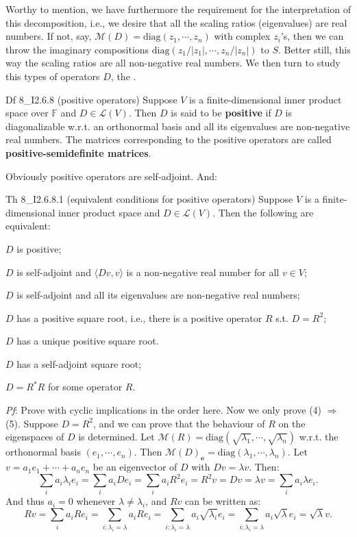 \documentclass{article}
\begin{document}
Worthy to mention, we have furthermore the requirement for the interpretation of this decomposition, i.e., we desire that all the scaling ratios (eigenvalues) are real numbers. If not, say, $\mathcal{M}(D) = \text{diag}(z_1, \cdots, z_n)$ with complex $z_i$'s, then we can throw the imaginary compositions $\text{diag}(z_1/|z_1|, \cdots, z_n/|z_n|)$ to $S$. Better still, this way the scaling ratios are all non-negative real numbers. We then turn to study this types of operators $D$, the .

\begin{Df}{Df 8\_I2.6.8 (positive operators)}
    Suppose $V$ is a finite-dimensional inner product space over $\mathbb{F}$ and $D\in\mathcal{L}(V)$. Then $D$ is said to be \textbf{positive} if $D$ is diagonalizable w.r.t. an orthonormal basis and all its eigenvalues are non-negative real numbers. The matrices corresponding to the positive operators are called \textbf{positive-semidefinite matrices}.
\end{Df}

Obviously \textcolor{Th}{positive operators are self-adjoint.} And:
\begin{Th}{Th 8\_I2.6.8.1 (equivalent conditions for positive operators)}
    Suppose $V$ is a finite-dimensional inner product space and $D\in\mathcal{L}(V)$. Then the following are equivalent:
    \begin{compactenum}
        \item $D$ is positive;
        \item $D$ is self-adjoint and $\langle Dv, v\rangle$ is a non-negative real number for all $v\in V$;
        \item $D$ is self-adjoint and all its eigenvalues are non-negative real numbers;
        \item $D$ has a positive square root, i.e., there is a positive operator $R$ s.t. $D = R^2$;
        \item $D$ has a unique positive square root.
        \item $D$ has a self-adjoint square root;
        \item $D = R^\ast R$ for some operator $R$.
    \end{compactenum}
    \tcblower
    \textit{Pf}: Prove with cyclic implications in the order here. Now we only prove (4) $\Rightarrow$ (5). Suppose $D = R^2$, and we can prove that the behaviour of $R$ on the eigenspaces of $D$ is determined. Let $\mathcal{M}(R) = \text{diag}(\sqrt{\lambda_1},\cdots,\sqrt{\lambda_n})$ w.r.t. the orthonormal basis $(e_1, \cdots, e_n)$. Then $\mathcal{M}(D)_{\pmb{e}} = \text{diag}(\lambda_1, \cdots, \lambda_n)$. Let $v = a_1e_1+\cdots+a_ne_n$ be an eigenvector of $D$ with $Dv = \lambda v$. Then:
    $$ \sum_{i} a_i\lambda_ie_i = \sum_{i}a_iDe_i = \sum_{i}a_iR^2e_i = R^2v = Dv = \lambda v = \sum_{i}a_i\lambda e_i. $$
    And thus $a_i = 0$ whenever $\lambda \neq \lambda_i$, and $Rv$ can be written as:
    $$ Rv = \sum_{i} a_iRe_i = \sum_{i: \lambda_i = \lambda} a_iRe_i = \sum_{i: \lambda_i = \lambda} a_i\sqrt{\lambda_i}e_i = \sum_{i:\lambda_i = \lambda} a_i\sqrt{\lambda}e_i = \sqrt{\lambda}v. $$ 
\end{Th}
\end{document}

